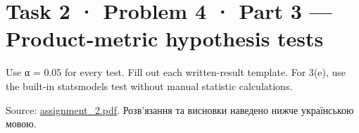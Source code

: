\documentclass[11pt]{article}
\title{}
\begin{document}
    
    \maketitle
    
    

    
    \section{Task 2 · Problem 4 · Part 3 --- Product-metric hypothesis
tests}\label{task-2-problem-4-part-3-product-metric-hypothesis-tests}

Use α = 0.05 for every test. Fill out each written-result template. For
3(e), use the built-in statsmodels test without manual statistic
calculations.

Source: \href{../../../input/assignment_2.pdf}{assignment\_2.pdf}. Розв'язання
та висновки наведено нижче українською мовою.
\end{document}

